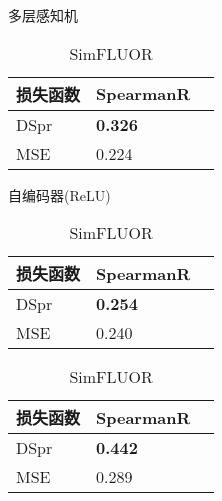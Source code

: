 \begin{table}
    \parbox{.32\linewidth}{
    \centering
        \caption{多层感知机}
        \begin{tabular}{lll}
        \hline
            损失函数     & SpearmanR \\ \hline
            DSpr        & \textbf{0.326}   \\ \hline
            MSE         & 0.224     \\ \hline
        \end{tabular}
        \label{tab:mlp}
    }
    \hfill
    \parbox{.32\linewidth}{
    \centering
        \caption{自编码器(ReLU)}
        \begin{tabular}{lll}
        \hline
            损失函数     & SpearmanR \\ \hline
            DSpr        & \textbf{0.254}  \\ \hline
            MSE         & 0.240     \\ \hline
        \end{tabular}
        \label{tab:ae}
    }
    \hfill
    \parbox{.32\linewidth}{
    \centering
        \caption{SimFLUOR}
        \begin{tabular}{lll}
        \hline
            损失函数     & SpearmanR \\ \hline
            DSpr        & \textbf{0.442}   \\ \hline
            MSE         & 0.289     \\ \hline
        \end{tabular}
        \label{tab:sim}
    }
\end{table}



